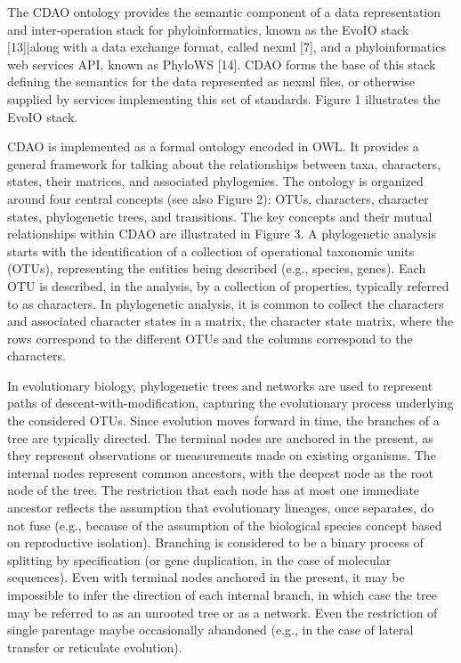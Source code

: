 \documentclass[10pt]{article}
\begin{document}
The CDAO ontology provides the semantic component of a data representation and
inter-operation stack for phyloinformatics, known as the EvoIO stack [13]|along
with a data exchange format, called nexml [7], and a phyloinformatics web
services API, known as PhyloWS [14]. CDAO forms the base of this stack defining
the semantics for the data represented as nexml files, or otherwise supplied by
services implementing this set of standards.  Figure 1 illustrates the EvoIO
stack.


CDAO is implemented as a formal ontology encoded in OWL. It provides a general
framework for talking about the relationships between taxa, characters, states,
their matrices, and associated phylogenies. The ontology is organized around
four central concepts (see also Figure 2): OTUs, characters, character states,
phylogenetic trees, and transitions. The key concepts and their mutual
relationships within CDAO are illustrated in Figure 3.  A phylogenetic analysis
starts with the identification of a collection of operational taxonomic units
(OTUs), representing the entities being described (e.g., species, genes). Each
OTU is described, in the analysis, by a collection of properties, typically
referred to as characters. In phylogenetic analysis, it is common to collect
the characters and associated character states in a matrix, the character state
matrix, where the rows correspond to the different OTUs and the columns
correspond to the characters.


In evolutionary biology, phylogenetic trees and networks are used to represent
paths of descent-with-modification, capturing the evolutionary process
underlying the considered OTUs.  Since evolution moves forward in time, the
branches of a tree are typically directed. The terminal nodes are anchored in
the present, as they represent observations or measurements made on existing
organisms. The internal nodes represent common ancestors, with the deepest node
as the root node of the tree. The restriction that each node has at most one
immediate ancestor reflects the assumption that evolutionary lineages, once
separates, do not fuse (e.g., because of the assumption of the biological
species concept based on reproductive isolation). Branching is considered to be
a binary process of splitting by specification (or gene duplication, in the
case of molecular sequences). Even with terminal nodes anchored in the present,
it may be impossible to infer the direction of each internal branch, in which
case the tree may be referred to as an unrooted tree or as a network. Even the
restriction of single parentage maybe occasionally abandoned (e.g., in the case
of lateral transfer or reticulate evolution).
\end{document}
